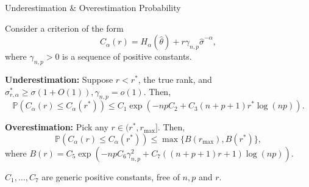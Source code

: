 \documentclass{beamer}
\newcommand{\prob}{\mathbb{P}}
\begin{document}
\begin{frame}{Underestimation \& Overestimation Probability}
    \footnotesize
    \begin{theorem}[Simplified]
        Consider a criterion of the form
        \begin{equation*}
            C_\alpha(r) = H_\alpha(\hat{\theta}) + r \gamma_{n,p} \widehat{\sigma}^{-\alpha},
        \end{equation*}
        \noindent where $\gamma_{n,p} > 0$ is a sequence of positive constants.

        \vspace*{0.5em}
        \textbf{Underestimation:} Suppose $r < r^\ast$, the true rank, and $\sigma^\ast_{r,\alpha} \geq \sigma(1 + O(1)), \gamma_{n,p} = o(1)$. Then,
        \begin{equation*}
            \prob(C_\alpha(r) \leq C_\alpha(r^\ast))
            \leq C_1 \exp\left( -npC_2 + C_3 (n+p+1)r^\ast\log(np) \right).
        \end{equation*}

        \pause
        \vspace*{0.5em}
        \textbf{Overestimation:} Pick any $r \in (r^\ast, r_{\max}]$. Then,
        \begin{equation*}
            \prob(C_\alpha(r) \leq C_\alpha(r^\ast)) \leq \max\{ B(r_{\max}), B(r^\ast) \},
        \end{equation*}
        \noindent where $B(r) = C_5 \exp\left( -npC_6 \gamma_{n,p}^2 + C_7 ((n+p+1)r+1)\log(np) \right)$.

        \vspace*{0.5em}
        \noindent $C_1, \dots, C_7$ are generic positive constants, free of $n, p$ and $r$.
    \end{theorem}
\end{frame}
\end{document}
